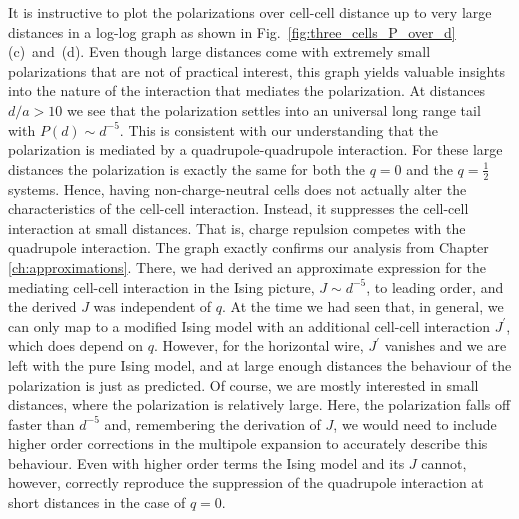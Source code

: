 It is instructive to plot the polarizations over cell-cell distance up to very
large distances in a log-log graph as shown in
Fig.~\ref{fig:three_cells_P_over_d}(c)~and~(d). Even though large distances come
with extremely small polarizations that are not of practical interest, this
graph yields valuable insights into the nature of the interaction that mediates
the polarization. At distances $d/a > 10$ we see that the polarization settles
into an universal long range tail with $P(d) \sim d^{-5}$. This is consistent
with our understanding that the polarization is mediated by a
quadrupole-quadrupole interaction. For these large distances the polarization is
exactly the same for both the $q=0$ and the $q=\frac{1}{2}$ systems. Hence,
having non-charge-neutral cells does not actually alter the characteristics of
the cell-cell interaction. Instead, it suppresses the cell-cell interaction at
small distances. That is, charge repulsion competes with the quadrupole
interaction. The graph exactly confirms our analysis from Chapter
\ref{ch:approximations}. There, we had derived an approximate expression for the
mediating cell-cell interaction in the Ising picture, $J \sim d^{-5}$, to
leading order, and the derived $J$ was independent of $q$. At the time we had
seen that, in general, we can only map  to a modified Ising model with
an additional cell-cell interaction $J^{\prime}$, which does depend on $q$.
However, for the horizontal wire, $J^{\prime}$ vanishes and we are left with the
pure Ising model, and at large enough distances the behaviour of the
polarization is just as predicted. Of course, we are mostly interested in small
distances, where the polarization is relatively large. Here, the polarization
falls off faster than $d^{-5}$ and, remembering the derivation of $J$, we would
need to include higher order corrections in the multipole expansion to
accurately describe this behaviour. Even with higher order terms the Ising model
and its $J$ cannot, however, correctly reproduce the suppression of the
quadrupole interaction at short distances in the case of $q=0$.

